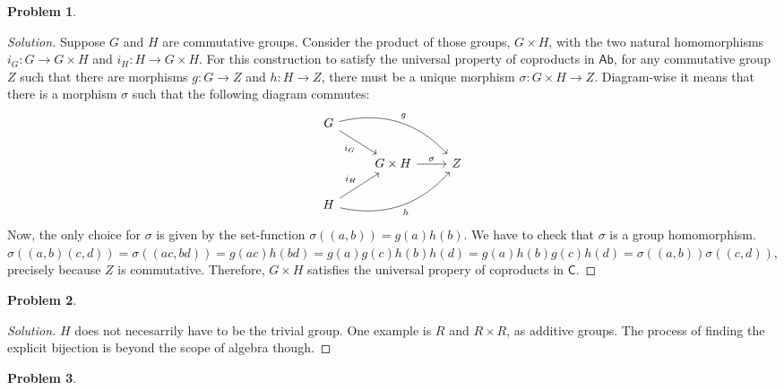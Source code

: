 \documentclass{article}
\theoremstyle{definition}
\newtheorem{problem-internal}{Problem}[subsection]
\newenvironment{problem}{
	\medskip
	\begin{problem-internal}
	}{
\end{problem-internal}
}
\newenvironment{solution}{
	\begin{proof}[Solution]
		\vspace{-8px}
		\setlength{\parskip}{4px}
		\setlength{\parindent}{0px}
	}{
\end{proof}
}
\newcommand{\C}{\mathsf{C}}
\begin{document}
\begin{problem}
\end{problem}

\begin{solution}
		Suppose $G$ and $H$ are commutative groups. Consider the product of those groups, $G \times H$, with the two natural homomorphisms $i_G: G \to G \times H$ and $i_H: H \to G \times H$. For this construction to satisfy the universal property of coproducts in $\mathsf{Ab}$, for any commutative group $Z$ such that there are morphisms $g: G \to Z$ and $h: H \to Z$, there must be a unique morphism $\sigma: G \times H \to Z$. Diagram-wise it means that there is a morphism $\sigma$ such that the following diagram commutes:
		\begin{equation*}
			\begin{tikzcd}
				G
					\arrow[drr, bend left, "g"]
					\arrow[dr, "i_G" swap]
					& &\\
				&
					G \times H
						\arrow[r, "\sigma"]
					& Z\\
				H
					\arrow[urr, bend right, "h" swap]
					\arrow[ur, "i_H"]
					& &
			\end{tikzcd}
		\end{equation*}
		Now, the only choice for $\sigma$ is given by the set-function $\sigma((a,b))=g(a)h(b)$. We have to check that $\sigma$ is a group homomorphism. $\sigma((a,b)(c,d))=\sigma((ac,bd))=g(ac)h(bd)=g(a)g(c)h(b)h(d)=g(a)h(b)g(c)h(d)=\sigma((a,b))\sigma((c,d))$, precisely because $Z$ is commutative. Therefore, $G \times H$ satisfies the universal propery of coproducts in $\C$.
\end{solution}

\begin{problem}
\end{problem}

\begin{solution}
	$H$ does not necesarrily have to be the trivial group. One example is $R$ and $R \times R$, as additive groups. The process of finding the explicit bijection is beyond the scope of algebra though.
\end{solution}

\begin{problem}
\end{problem}
\end{document}
